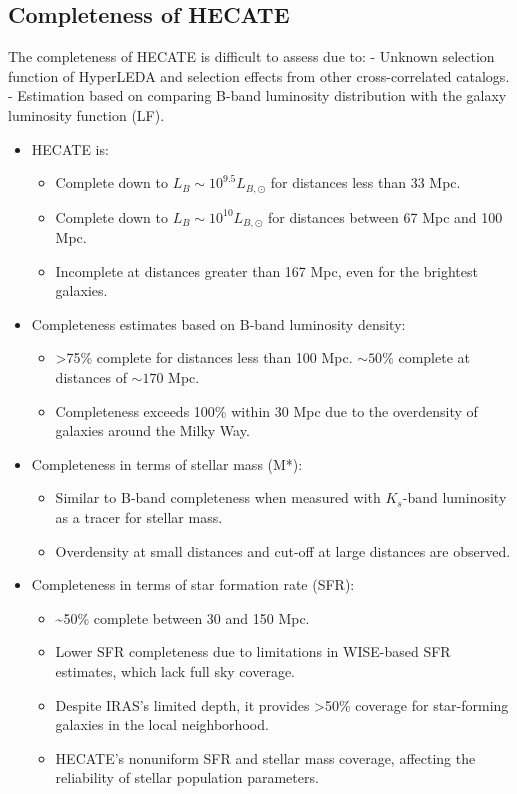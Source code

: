 \documentclass[
]{article}
\begin{document}
\subsection{Completeness of HECATE}\label{completeness-of-hecate}

The completeness of HECATE is difficult to assess due to: - Unknown
selection function of HyperLEDA and selection effects from other
cross-correlated catalogs. - Estimation based on comparing B-band
luminosity distribution with the galaxy luminosity function (LF).

\begin{itemize}
\item
  HECATE is:

  \begin{itemize}
  \item
    Complete down to \(L_B\sim 10^{9.5} L_{B,\odot}\) for distances less
    than 33 Mpc.
  \item
    Complete down to \(L_B\sim 10^{10} L_{B,\odot}\) for distances
    between 67 Mpc and 100 Mpc.
  \item
    Incomplete at distances greater than 167 Mpc, even for the brightest
    galaxies.
  \end{itemize}
\item
  Completeness estimates based on B-band luminosity density:

  \begin{itemize}
  \item
    \textgreater75\% complete for distances less than 100 Mpc.
    \(\sim 50\%\) complete at distances of \(\sim170\) Mpc.
  \item
    Completeness exceeds 100\% within 30 Mpc due to the overdensity of
    galaxies around the Milky Way.
  \end{itemize}
\item
  Completeness in terms of stellar mass (M*):

  \begin{itemize}
  \item
    Similar to B-band completeness when measured with \(K_s\)-band
    luminosity as a tracer for stellar mass.
  \item
    Overdensity at small distances and cut-off at large distances are
    observed.
  \end{itemize}
\item
  Completeness in terms of star formation rate (SFR):

  \begin{itemize}
  \item
    \textasciitilde50\% complete between 30 and 150 Mpc.
  \item
    Lower SFR completeness due to limitations in WISE-based SFR
    estimates, which lack full sky coverage.
  \item
    Despite IRAS's limited depth, it provides \textgreater50\% coverage
    for star-forming galaxies in the local neighborhood.
  \item
    HECATE's nonuniform SFR and stellar mass coverage, affecting the
    reliability of stellar population parameters.
  \end{itemize}
\end{itemize}
\end{document}
